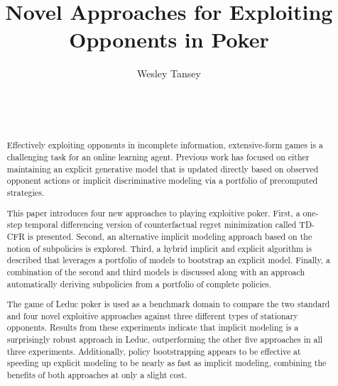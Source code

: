 \documentclass{aamas2013}
\begin{document}


\title{Novel Approaches for Exploiting Opponents in Poker}


\author{
\alignauthor
Wesley Tansey\\
       \\
       \\
       \\
}

\maketitle

\begin{abstract}
Effectively exploiting opponents in incomplete information, extensive-form games is a challenging task for an online learning agent. Previous work has focused on either maintaining an explicit generative model that is updated directly based on observed opponent actions or implicit discriminative modeling via a portfolio of precomputed strategies.

This paper introduces four new approaches to playing exploitive poker. First, a one-step temporal differencing version of counterfactual regret minimization called TD-CFR is presented. Second, an alternative implicit modeling approach based on the notion of subpolicies is explored. Third, a hybrid implicit and explicit algorithm is described that leverages a portfolio of models to bootstrap an explicit model. Finally, a combination of the second and third models is discussed along with an approach automatically deriving subpolicies from a portfolio of complete policies.

The game of Leduc poker is used as a benchmark domain to compare the two standard and four novel exploitive approaches against three different types of stationary opponents. Results from these experiments indicate that implicit modeling is a surprisingly robust approach in Leduc, outperforming the other five approaches in all three experiments. Additionally, policy bootstrapping appears to be effective at speeding up explicit modeling to be nearly as fast as implicit modeling, combining the benefits of both approaches at only a slight cost.
\end{abstract}
\end{document}
